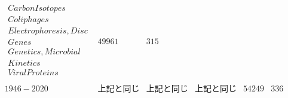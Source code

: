 \begin{table}[h]
\begin{center}
\[\begin{array}{cccccc}
\begin{array}{c}
 {Carbon Isotopes} \\
 {Coliphages} \\
 {Electrophoresis, Disc} \\
 {Genes} \\
 {Genetics, Microbial} \\
 {Kinetics} \\
 {Viral Proteins} \\
\end{array}
 & 49961 & 315 \\
 {1946-2020} & {上記と同じ} & {上記と同じ} & {上記と同じ} & 54249 & 336 \\
\end{array}\]
\end{center}
\end{table}
